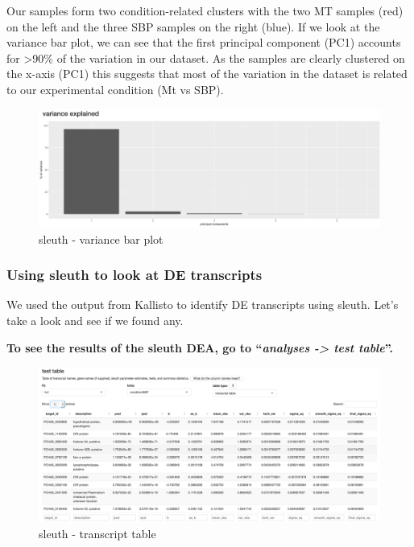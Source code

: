 \documentclass[11pt]{article}
\begin{document}
\newpage

    Our samples form two condition-related clusters with the two MT samples
(red) on the left and the three SBP samples on the right (blue). If we
look at the variance bar plot, we can see that the first principal
component (PC1) accounts for \textgreater90\% of the variation in our
dataset. As the samples are clearly clustered on the x-axis (PC1) this
suggests that most of the variation in the dataset is related to our
experimental condition (Mt vs SBP).

    \begin{figure}[!h]
\centering
\includegraphics{images/sleuth-pca-bar.png}
\caption{sleuth - variance bar plot}
\end{figure}

    \hypertarget{using-sleuth-to-look-at-de-transcripts}{%
\subsubsection{Using sleuth to look at DE
transcripts}\label{using-sleuth-to-look-at-de-transcripts}}

We used the output from Kallisto to identify DE transcripts using
sleuth. Let's take a look and see if we found any.

\textbf{To see the results of the sleuth DEA, go to ``\textit{analyses
-\textgreater{} test table}''.}

    \begin{figure}[!h]
\centering
\includegraphics{images/sleuth-transcript-table.png}
\caption{sleuth - transcript table}
\end{figure}
\end{document}
